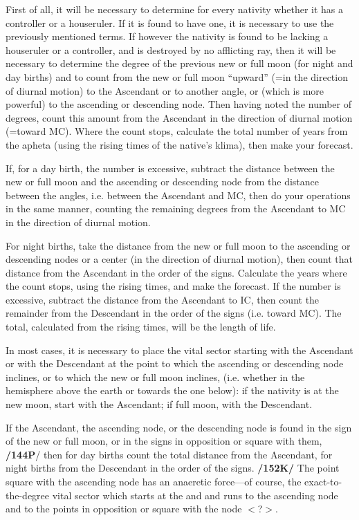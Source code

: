 First of all, it will be necessary to determine for every nativity whether it has a controller or a houseruler. If it is found to have one, it is necessary to use the previously mentioned terms. If however the nativity is found to be lacking a houseruler or a controller, and is destroyed by no afflicting ray, then it will be necessary to determine the degree of the previous new or full moon (for night and day births) and to count from the new or full moon “upward” (=in the direction of
diurnal motion) to the Ascendant or to another angle, or (which is more powerful) to the ascending or descending node. Then having noted the number of degrees, count this amount from the Ascendant in the direction of diurnal motion (=toward MC). Where the count stops, calculate the total number of years from
the apheta (using the rising times of the native’s klima), then make your forecast.

If, for a day birth, the number is excessive, subtract the distance between the new or full moon and the ascending or descending node from the distance between the angles, i.e. between the Ascendant and MC, then do your operations in the same manner, counting the remaining degrees from the Ascendant to MC in the direction of diurnal motion. 

For night births, take the distance from the new or full moon to the ascending or descending nodes or a center (in the direction of diurnal motion), then count that distance from
the Ascendant in the order of the signs. Calculate the years where the count stops, using the rising times, and make the forecast. If the number is excessive, subtract the distance from the Ascendant to IC, then count the remainder from the Descendant in the order of the signs (i.e. toward MC). The total, calculated from the rising times, will be the length of life.

In most cases, it is necessary to place the vital sector starting with the Ascendant or with the Descendant at the point to which the ascending or descending node inclines, or to which the new or full moon inclines, (i.e. whether in the hemisphere above the earth or towards the one below): if the nativity is
at the new moon, start with the Ascendant; if full moon, with the Descendant.

If the Ascendant, the ascending node, or the descending node is found in the sign of the new or full moon, or in the signs in opposition or square with them, \textbf{/144P}/ then for day births count the total distance from the Ascendant, for night births from the Descendant in the order of the signs. \textbf{/152K/} The point square with the ascending node has an anaeretic force—of course, the exact-to-the-degree vital sector which starts at the \Sun\xspace and \Moon\xspace and runs to the ascending node and to the points in opposition or square with the node $<$?$>$.


